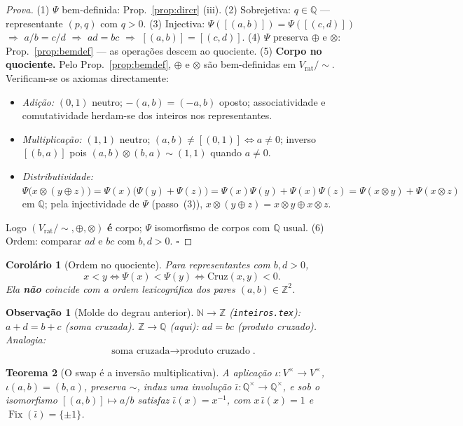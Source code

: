 \documentclass[11pt,a4paper]{article}
\newtheorem{teorema}{Teorema}
\newtheorem{corolario}[teorema]{Corolário}
\newtheorem{observacao}{Observação}
\newcommand{\code}[1]{\texttt{\small #1}}
\begin{document}
\begin{proof}[Prova]
(1) $\Psi$ bem-definida: Prop.~\ref{prop:dircr} (iii).
(2) Sobrejetiva: $q\in\mathbb{Q}$ --- representante $(p,q)$ com $q>0$.
(3) Injectiva: $\Psi([(a,b)])=\Psi([(c,d)])$ $\Rightarrow$ $a/b=c/d$
$\Rightarrow$ $ad=bc$ $\Rightarrow$ $[(a,b)]=[(c,d)]$.
(4) $\Psi$ preserva $\oplus$ e $\otimes$: Prop.~\ref{prop:bemdef} --- as operações
descem ao quociente.
(5) \textbf{Corpo no quociente.} Pelo Prop.~\ref{prop:bemdef}, $\oplus$ e $\otimes$ são
bem-definidas em $V_{\mathrm{rat}}/{\sim}$. Verificam-se os axiomas directamente:
\begin{itemize}\itemsep1pt
\item \emph{Adição:} $(0,1)$ neutro; $-(a,b)=(-a,b)$ oposto;
      associatividade e comutatividade herdam-se dos inteiros nos representantes.
\item \emph{Multiplicação:} $(1,1)$ neutro; $(a,b)\neq[(0,1)]\iff a\neq0$;
      inverso $[(b,a)]$ pois $(a,b)\otimes(b,a)\sim(1,1)$ quando $a\neq0$.
\item \emph{Distributividade:}
      $\Psi\bigl(x\otimes(y\oplus z)\bigr)=\Psi(x)\bigl(\Psi(y)+\Psi(z)\bigr)
      =\Psi(x)\Psi(y)+\Psi(x)\Psi(z)
      =\Psi(x\otimes y)+\Psi(x\otimes z)$ em $\mathbb{Q}$; pela injectividade de
      $\Psi$ (passo~(3)), $x\otimes(y\oplus z)=x\otimes y\oplus x\otimes z$.
\end{itemize}
Logo $(V_{\mathrm{rat}}/{\sim},\oplus,\otimes)$ \textbf{é} corpo; $\Psi$ isomorfismo
de corpos com $\mathbb{Q}$ usual.
(6) Ordem: comparar $ad$ e $bc$ com $b,d>0$. $\square$
\end{proof}

\begin{corolario}[Ordem no quociente]\label{cor:ordem}
Para representantes com $b,d>0$,
\[
x<y\iff\Psi(x)<\Psi(y)\iff\mathrm{Cruz}(x,y)<0.
\]
Ela \textbf{não} coincide com a ordem lexicográfica dos pares
$(a,b)\in\mathbb{Z}^{2}$.
\end{corolario}

\begin{observacao}[Molde do degrau anterior]
$\mathbb{N}\!\to\!\mathbb{Z}$ (\code{inteiros.tex}): $a+d=b+c$ (soma cruzada).
$\mathbb{Z}\!\to\!\mathbb{Q}$ (aqui): $ad=bc$ (produto cruzado). Analogia:
\[
\boxed{\text{soma cruzada}\longrightarrow\text{produto cruzado}}.
\]
\end{observacao}

\begin{teorema}[O swap é a inversão multiplicativa]\label{thm:swap-inverso}
A aplicação $\iota:V^{\times}\to V^{\times}$, $\iota(a,b)=(b,a)$, preserva
$\sim$, induz uma involução
$\bar\iota:\mathbb{Q}^{\times}\to\mathbb{Q}^{\times}$, e sob o isomorfismo
$[(a,b)]\mapsto a/b$ satisfaz $\bar\iota(x)=x^{-1}$, com
$x\,\bar\iota(x)=1$ e $\operatorname{Fix}(\bar\iota)=\{\pm1\}$.
\end{teorema}
\end{document}
